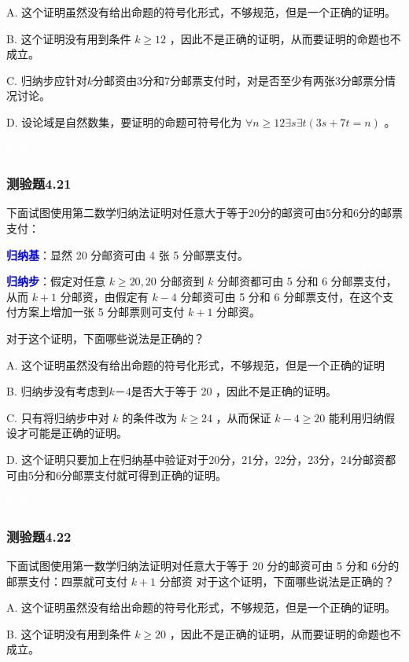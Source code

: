 \documentclass[UTF8, heading=true]{ctexart}
\begin{document}
A. 
这个证明虽然没有给出命题的符号化形式，不够规范，但是一个正确的证明。

B. 
这个证明没有用到条件 $k \geq 12$ ，因此不是正确的证明，从而要证明的命题也不成立。

C. 
归纳步应针对$k$分邮资由3分和7分邮票支付时，对是否至少有两张3分邮票分情况讨论。

D.  
设论域是自然数集，要证明的命题可符号化为 $\forall n \geq 12 \exists s \exists t(3 s+7 t=n)$ 。


\textcolor{white}{答案：CD}

\subsubsection{测验题4.21}

下面试图使用第二数学归纳法证明对任意大于等于20分的邮资可由5分和6分的邮票支付：

\textcolor{blue}{\textbf{归纳基}}：显然 20 分邮资可由 4 张 5 分邮票支付。

\textcolor{blue}{\textbf{归纳步}}：假定对任意 $k \geq 20,20$ 分邮资到 $k$ 分邮资都可由 5 分和 6 分邮票支付，从而 $k+1$ 分邮资，由假定有 $k-4$ 分邮资可由 5 分和 6 分邮票支付，在这个支付方案上增加一张 5 分邮票则可支付 $k+1$ 分邮资。

对于这个证明，下面哪些说法是正确的？

A. 这个证明虽然没有给出命题的符号化形式，不够规范，但是一个正确的证明

B. 归纳步没有考虑到$k－4$是否大于等于 20 ，因此不是正确的证明。

C. 只有将归纳步中对 $k$ 的条件改为 $k \geq 24$ ，从而保证 $k-4 \geq 20$ 能利用归纳假设才可能是正确的证明。

D. 这个证明只要加上在归纳基中验证对于20分，21分，22分，23分，24分邮资都可由5分和6分邮票支付就可得到正确的证明。


\textcolor{white}{答案：BC}

\subsubsection{测验题4.22}

下面试图使用第一数学归纳法证明对任意大于等于 20 分的邮资可由 5 分和 6分的邮票支付：四票就可支付 $k+1$ 分部资
对于这个证明，下面哪些说法是正确的？

A. 这个证明虽然没有给出命题的符号化形式，不够规范，但是一个正确的证明。

B. 这个证明没有用到条件 $k \geq 20$ ，因此不是正确的证明，从而要证明的命题也不成立。
\end{document}
